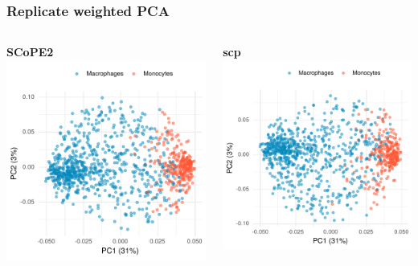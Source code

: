 \documentclass{beamer}
\newcommand{\frametitlesection}[1]{\frametitle{\centering #1 \footnotesize \hspace{0pt plus 1 filll} \insertsection}}
\begin{document}
\begin{frame}
    \frametitlesection{Replicate weighted PCA}

    \begin{columns}
        \begin{column}{0.5\textwidth}
            \textbf{SCoPE2}
            \includegraphics[width=\textwidth]{figs/wPCA_SCoPE2.pdf}
        \end{column}
        \begin{column}{0.5\textwidth}
            \textbf{scp}
            \includegraphics[width=\textwidth]{figs/wPCA_scp.pdf}
        \end{column}
    \end{columns}
\end{frame}
\end{document}
